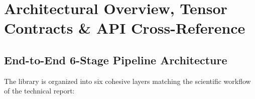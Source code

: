 \documentclass[10pt,a4paper]{article}
\renewcommand{\_}{\origunderscore\allowbreak}
\begin{document}
\vspace{-0.2em}
{\small\tableofcontents}

\clearpage
\section*{Architectural Overview, Tensor Contracts \& API Cross-Reference}

\subsection*{End-to-End 6-Stage Pipeline Architecture}
The library is organized into six cohesive layers matching the scientific workflow of the technical report:
\end{document}
